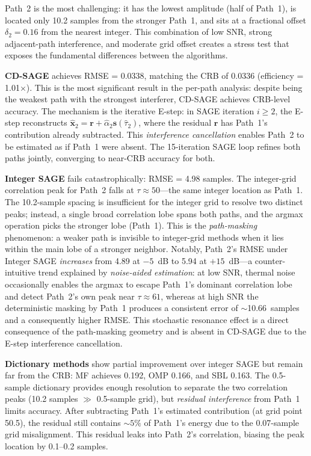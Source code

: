 \documentclass[a4paper,fleqn]{cas-dc}
\begin{document}
Path~2 is the most challenging: it has the lowest amplitude (half of Path~1), is located only 10.2 samples from the stronger Path~1, and sits at a fractional offset $\delta_2 = 0.16$ from the nearest integer. This combination of low SNR, strong adjacent-path interference, and moderate grid offset creates a stress test that exposes the fundamental differences between the algorithms.

\textbf{CD-SAGE} achieves RMSE = 0.0338, matching the CRB of 0.0336 (efficiency = 1.01$\times$). This is the most significant result in the per-path analysis: despite being the weakest path with the strongest interferer, CD-SAGE achieves CRB-level accuracy. The mechanism is the iterative E-step: in SAGE iteration $i \ge 2$, the E-step reconstructs $\hat{\mathbf{x}}_2 = \mathbf{r} + \hat{\alpha}_2\mathbf{s}(\hat{\tau}_2)$, where the residual $\mathbf{r}$ has Path~1's contribution already subtracted. This \textit{interference cancellation} enables Path~2 to be estimated as if Path~1 were absent. The 15-iteration SAGE loop refines both paths jointly, converging to near-CRB accuracy for both.

\textbf{Integer SAGE} fails catastrophically: RMSE = 4.98 samples. The integer-grid correlation peak for Path~2 falls at $\tau \approx 50$---the same integer location as Path~1. The 10.2-sample spacing is insufficient for the integer grid to resolve two distinct peaks; instead, a single broad correlation lobe spans both paths, and the argmax operation picks the stronger lobe (Path~1). This is the \textit{path-masking} phenomenon: a weaker path is invisible to integer-grid methods when it lies within the main lobe of a stronger neighbor. Notably, Path~2's RMSE under Integer SAGE \textit{increases} from 4.89 at $-5$~dB to 5.94 at $+15$~dB---a counter-intuitive trend explained by \textit{noise-aided estimation}: at low SNR, thermal noise occasionally enables the argmax to escape Path~1's dominant correlation lobe and detect Path~2's own peak near $\tau\approx61$, whereas at high SNR the deterministic masking by Path~1 produces a consistent error of $\sim$10.66~samples and a consequently higher RMSE. This stochastic resonance effect is a direct consequence of the path-masking geometry and is absent in CD-SAGE due to the E-step interference cancellation.

\textbf{Dictionary methods} show partial improvement over integer SAGE but remain far from the CRB: MF achieves 0.192, OMP 0.166, and SBL 0.163. The 0.5-sample dictionary provides enough resolution to separate the two correlation peaks (10.2 samples $\gg$ 0.5-sample grid), but \textit{residual interference} from Path~1 limits accuracy. After subtracting Path~1's estimated contribution (at grid point 50.5), the residual still contains $\sim 5\%$ of Path~1's energy due to the 0.07-sample grid misalignment. This residual leaks into Path~2's correlation, biasing the peak location by 0.1--0.2 samples.
\end{document}
